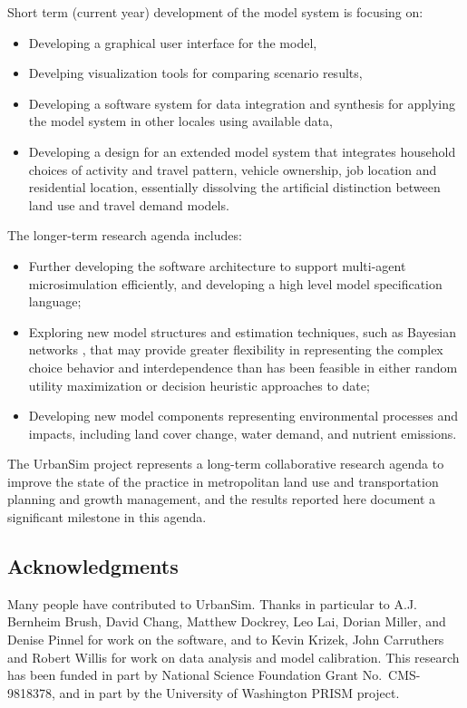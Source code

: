 \documentclass[fleqn]{article}
\begin{document}
Short term (current year) development of the model system is
focusing on:

\begin{itemize}
\item Developing a graphical user interface for the model,\
\item Develping visualization tools for comparing scenario results,\
\item Developing a software system for data integration and synthesis for applying the model system in other locales using
available data,\
\item Developing a design for an extended model system that integrates household choices of
activity and travel pattern, vehicle ownership, job location and
residential location, essentially dissolving the artificial
distinction between land use and travel demand models.\
\end{itemize}

The longer-term research agenda includes:
\begin{itemize}
\item Further developing the software architecture
to support multi-agent microsimulation efficiently, and developing
a high level model specification language;\
\item Exploring new model structures and estimation techniques,
such as Bayesian networks \cite{jensen-bayesian-1996}, that may provide
greater flexibility in representing the complex choice behavior
and interdependence than has been feasible in either random
utility maximization or decision heuristic approaches to date;\
\item Developing new model components representing environmental
processes and impacts, including land cover change, water demand,
and nutrient emissions.
\end{itemize}

The UrbanSim project represents a long-term collaborative research
agenda to improve the state of the practice in metropolitan land
use and transportation planning and growth management, and the
results reported here document a significant milestone in this
agenda.

\subsection*{Acknowledgments}

Many people have contributed to UrbanSim.  Thanks in particular to
A.J. Bernheim Brush, David Chang, Matthew Dockrey, Leo Lai, Dorian Miller,
and Denise Pinnel for work on the software, and to Kevin Krizek, John
Carruthers and Robert Willis for work on data analysis and model
calibration.  This research has been funded in part by National Science
Foundation Grant No.~CMS-9818378, and in part by the University of
Washington PRISM project.


\newpage



\end{document}
